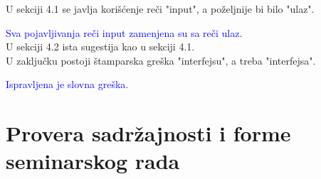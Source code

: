 \documentclass[a4paper]{report}
\newcommand{\odgovor}[1]{\textcolor{blue}{#1}}
\begin{document}
U sekciji 4.1 se javlja korišćenje reči "input", a poželjnije bi bilo "ulaz". 

\odgovor{
Sva pojavljivanja reči input zamenjena su sa reči ulaz.
}
\\

U sekciji 4.2 ista sugestija kao u sekciji 4.1.
\\
U zaključku postoji štamparska greška "interfejsu", a treba "interfejsa". 

\odgovor {
Ispravljena je slovna greška.
}

\section{Provera sadržajnosti i forme seminarskog rada}
\end{document}
